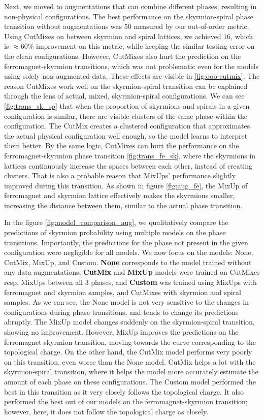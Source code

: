 Next, we moved to augmentations that can combine different phases, resulting in non-physical configurations. The best performance on the skyrmion-spiral phase transition without augmentations was $50$ measured by our out-of-order metric. Using CutMixes on between skyrmion and spiral lattices, we achieved $16$, which is $\approx 60\%$ improvement on this metric, while keeping the similar testing error on the clean configurations. However, CutMixes also hurt the prediction on the ferromagnet-skyrmion transitions, which was not problematic even for the models using solely non-augmented data. These effects are visible in \ref{fig:ooo-cutmix}. The reason CutMixes work well on the skyrmion-spiral transition can be explained through the lens of actual, mixed, skyrmion-spiral configurations. We can see \ref{fig:trans_sk_sp} that when the proportion of skyrmions and spirals in a given configuration is similar, there are visible clusters of the same phase within the configuration. The CutMix creates a clustered configuration that approximates the actual physical configuration well enough, so the model learns to interpret them better. By the same logic, CutMixes can hurt the performance on the ferromagnet-skyrmion phase transition \ref{fig:trans_fe_sk}, where the skyrmions in lattices continuously increase the spaces between each other, instead of creating clusters. That is also a probable reason that MixUps' performance slightly improved during this transition. As shown in figure \ref{fig:aug_fe}, the MixUp of ferromagnet and skyrmion lattice effectively makes the skyrmions smaller, increasing the distance between them, similar to the actual phase transition.

In the figure \ref{fig:model_comparison_aug}, we qualitatively compare the predictions of skyrmion probability using multiple models on the phase transitions. Importantly, the predictions for the phase not present in the given configuration were negligible for all models. We now focus on the models: None, CutMix, MixUp, and Custom. \textbf{None} corresponds to the model trained without any data augmentations, \textbf{CutMix} and \textbf{MixUp} models were trained on CutMixes resp. MixUps between all $3$ phases, and \textbf{Custom} was trained using MixUps with ferromagnet and skyrmion samples, and CutMixes with skyrmion and spiral samples. As we can see, the None model is not very sensitive to the changes in configurations during phase transitions, and tends to change its predictions abruptly. The MixUp model changes suddenly on the skyrmion-spiral transition, showing no improvement. However, MixUp improves the predictions on the ferromagnet skyrmion transition, moving towards the curve corresponding to the topological charge.
On the other hand, the CutMix model performs very poorly on this transition, even worse than the None model. CutMix helps a lot with the skyrmion-spiral transition, where it helps the model more accurately estimate the amount of each phase on these configurations. The Custom model performed the best in this transition as it very closely follows the topological charge. It also performed the best out of our models on the ferromagnet-skyrmion transition; however, here, it does not follow the topological charge as closely.

